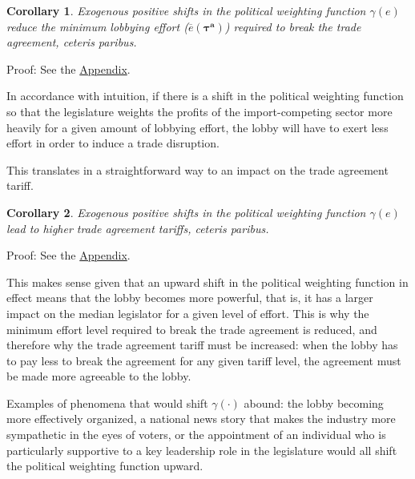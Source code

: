 \documentclass[authoryear, review]{elsarticle}
\newtheorem{corollary}{Corollary}
\newcommand{\ov}{\overline}
\newcommand{\bta}{\bm{\tau^a}}
\newcommand{\ga}{\gamma}
\begin{document}
\begin{corollary}
  \label{cor:eg}
  Exogenous positive shifts in the political weighting function $\ga(e)$ reduce the minimum lobbying effort ($\ov{e}(\bta)$) required to break the trade agreement, \emph{ceteris paribus}.

\end{corollary}

Proof: See the \hyperlink{Cor_eg}{Appendix}.

\noindent In accordance with intuition, if there is a shift in the political weighting function so that the legislature weights the profits of the import-competing sector more heavily for a given amount of lobbying effort, the lobby will have to exert less effort in order to induce a trade disruption.

This translates in a straightforward way to an impact on the trade agreement tariff.

\begin{corollary}
  Exogenous positive shifts in the political weighting function $\ga(e)$ lead to higher trade agreement tariffs, \emph{ceteris paribus}.
  \label{cor:tg}
\end{corollary}

Proof: See the \hyperlink{Cor_tg}{Appendix}.

\noindent This makes sense given that an upward shift in the political weighting function in effect means that the lobby becomes more powerful, that is, it has a larger impact on the median legislator for a given level of effort. This is why the minimum effort level required to break the trade agreement is reduced, and therefore why the trade agreement tariff must be increased: when the lobby has to pay less to break the agreement for any given tariff level, the agreement must be made more agreeable to the lobby.

Examples of phenomena that would shift $\ga(\cdot)$ abound: the lobby becoming more effectively organized, a national news story that makes the industry more sympathetic in the eyes of voters, or the appointment of an individual who is particularly supportive to a key leadership role in the legislature would all shift the political weighting function upward.
\end{document}

